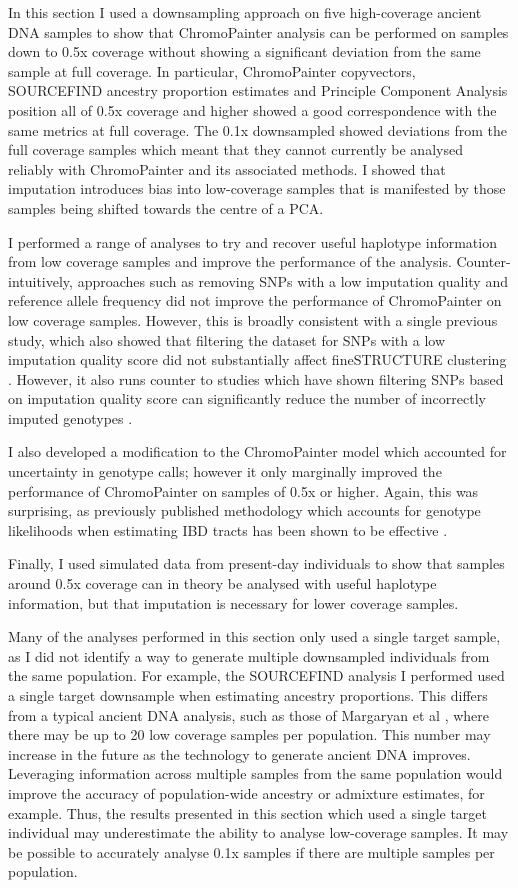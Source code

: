{In this section I used a downsampling approach on five high-coverage ancient DNA samples to show that ChromoPainter analysis can be performed on samples down to 0.5x coverage without showing a significant deviation from the same sample at full coverage. In particular, ChromoPainter copyvectors, SOURCEFIND ancestry proportion estimates and Principle Component Analysis position all of 0.5x coverage and higher showed a good correspondence with the same metrics at full coverage. The 0.1x downsampled showed deviations from the full coverage samples which meant that they cannot currently be analysed reliably with ChromoPainter and its associated methods. I showed that imputation introduces bias into low-coverage samples that is manifested by those samples being shifted towards the centre of a PCA. 

I performed a range of analyses to try and recover useful haplotype information from low coverage samples and improve the performance of the analysis. Counter-intuitively, approaches such as removing SNPs with a low imputation quality and reference allele frequency did not improve the performance of ChromoPainter on low coverage samples. However, this is broadly consistent with a single previous study, which also showed that filtering the dataset for SNPs with a low imputation quality score did not substantially affect fineSTRUCTURE clustering \cite{Martiniano2017}. However, it also runs counter to studies which have shown filtering SNPs based on imputation quality score can significantly reduce the number of incorrectly imputed genotypes \cite{hui2020evaluating}. 

I also developed a modification to the ChromoPainter model which accounted for uncertainty in genotype calls; however it only marginally improved the performance of ChromoPainter on samples of 0.5x or higher. Again, this was surprising, as previously published methodology which accounts for genotype likelihoods when estimating IBD tracts has been shown to be effective \cite{Vieira2016}.

Finally, I used simulated data from present-day individuals to show that samples around 0.5x coverage can in theory be analysed with useful haplotype information, but that imputation is necessary for lower coverage samples.

Many of the analyses performed in this section only used a single target sample, as I did not identify a way to generate multiple downsampled individuals from the same population. For example, the SOURCEFIND analysis I performed  used a single target downsample when estimating ancestry proportions. This differs from a typical ancient DNA analysis, such as those of Margaryan et al \cite{margaryan2020population}, where there may be up to 20 low coverage samples per population. This number may increase in the future as the technology to generate ancient DNA improves. Leveraging information across multiple samples from the same population  would improve the accuracy of population-wide ancestry or admixture estimates, for example. Thus, the results presented in this section which used a single target individual may underestimate the ability to analyse low-coverage samples. It may be possible to accurately analyse 0.1x samples if there are multiple samples per population. 

}
